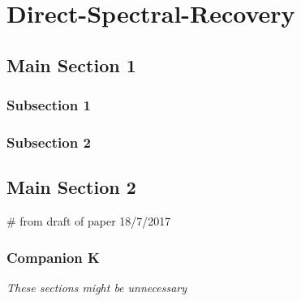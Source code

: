 

\chapter{Direct-Spectral-Recovery}  %

\label{cha:Chapter3} 


\section{Main Section 1}



\subsection{Subsection 1}



\subsection{Subsection 2}


\section{Main Section 2}



# from draft of paper 18/7/2017
\subsection{Companion K}
\label{sec:companion_RV}
\emph{These sections might be unnecessary}\\

